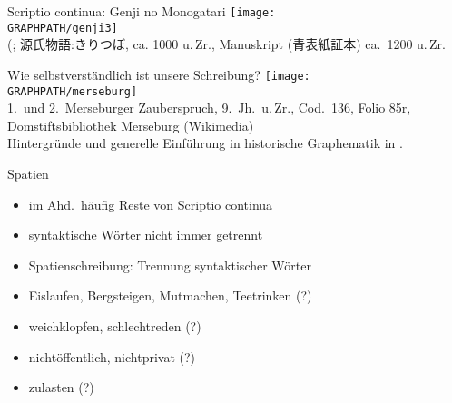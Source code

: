 \begin{frame}
  {Scriptio continua: Genji no Monogatari}
  \centering
  \texttt{[image: \\GRAPHPATH/genji3]}\\
  {\tiny (\citealt{Rickmeyer1991}; 源氏物語:きりつぼ, ca. 1000 u.\,Zr., Manuskript (青表紙証本) ca.\ 1200 u.\,Zr.}
\end{frame}

\begin{frame}
  {Wie selbstverständlich ist unsere Schreibung?}
  \pause
  \centering
  \texttt{[image: \\GRAPHPATH/merseburg]}\\[0.5\baselineskip]
  {\tiny 1.~und 2.~Merseburger Zauberspruch, 9.~Jh.\ u.\,Zr., Cod.\ 136, Folio 85r, Domstiftsbibliothek Merseburg (Wikimedia)\\[-1\baselineskip]
    Hintergründe und generelle Einführung in historische Graphematik in \citet{Elmentaler2018}.}
\end{frame}

\begin{frame}
  {Spatien}
  \pause
  \begin{itemize}[<+->]
    \item im Ahd.\ häufig Reste von Scriptio continua
    \item syntaktische Wörter nicht immer getrennt
    \item \alert{Spatienschreibung}: Trennung syntaktischer Wörter
  \end{itemize}
  \pause
  \Halbzeile
  \begin{exe}
    \ex
    \begin{xlist}
      \pause
    \end{xlist}
    \pause
    \Halbzeile
    \ex
    \begin{xlist}
      \pause
    \end{xlist}
  \end{exe}
  \pause
  \begin{itemize}[<+->]
    \item Eislaufen, Bergsteigen, Mutmachen, Teetrinken (?)
    \item weichklopfen, schlechtreden (?)
    \item nichtöffentlich, nichtprivat (?)
    \item zulasten (?)
  \end{itemize}
\end{frame}

